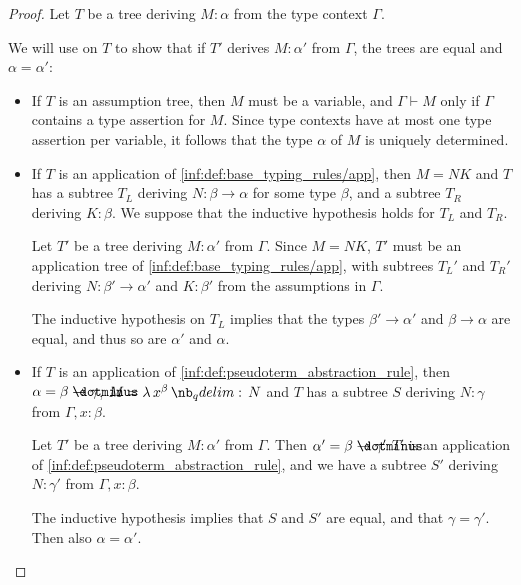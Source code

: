 \begin{proof}
  Let \( T \) be a tree deriving \( M: \alpha \) from the type context \( \Gamma \).

  We will use  on \( T \) to show that if \( T' \) derives \( M: \alpha' \) from \( \Gamma \), the trees are equal and \( \alpha = \alpha' \):
  \begin{itemize}
    \item If \( T \) is an assumption tree, then \( M \) must be a variable, and \( \Gamma \vdash M \) only if \( \Gamma \) contains a type assertion for \( M \). Since type contexts have at most one type assertion per variable, it follows that the type \( \alpha \) of \( M \) is uniquely determined.

    \item If \( T \) is an application of \ref{inf:def:base_typing_rules/app}, then \( M = NK \) and \( T \) has a subtree \( T_L \) deriving \( N: \beta \to \alpha \) for some type \( \beta \), and a subtree \( T_R \) deriving \( K: \beta \). We suppose that the inductive hypothesis holds for \( T_L \) and \( T_R \).

    Let \( T' \) be a tree deriving \( M: \alpha' \) from \( \Gamma \). Since \( M = NK \), \( T' \) must be an application tree of \ref{inf:def:base_typing_rules/app}, with subtrees \( T_L' \) and \( T_R' \) deriving \( N: \beta' \to \alpha' \) and \( K: \beta' \) from the assumptions in \( \Gamma \).

    The inductive hypothesis on \( T_L \) implies that the types \( \beta' \to \alpha' \) and \( \beta \to \alpha \) are equal, and thus so are \( \alpha' \) and \( \alpha \).

    \item If \( T \) is an application of \ref{inf:def:pseudoterm_abstraction_rule}, then \( \alpha = \beta \synimplies \gamma \), \( M = \qabs {x^\beta} N \) and \( T \) has a subtree \( S \) deriving \( N: \gamma \) from \( \Gamma, x: \beta \).

    Let \( T' \) be a tree deriving \( M: \alpha' \) from \( \Gamma \). Then \( \alpha' = \beta \synimplies \gamma' \) \( T' \) is an application of \ref{inf:def:pseudoterm_abstraction_rule}, and we have a subtree \( S' \) deriving \( N: \gamma' \) from \( \Gamma, x: \beta \).

    The inductive hypothesis implies that \( S \) and \( S' \) are equal, and that \( \gamma = \gamma' \). Then also \( \alpha = \alpha' \).
  \end{itemize}
\end{proof}

